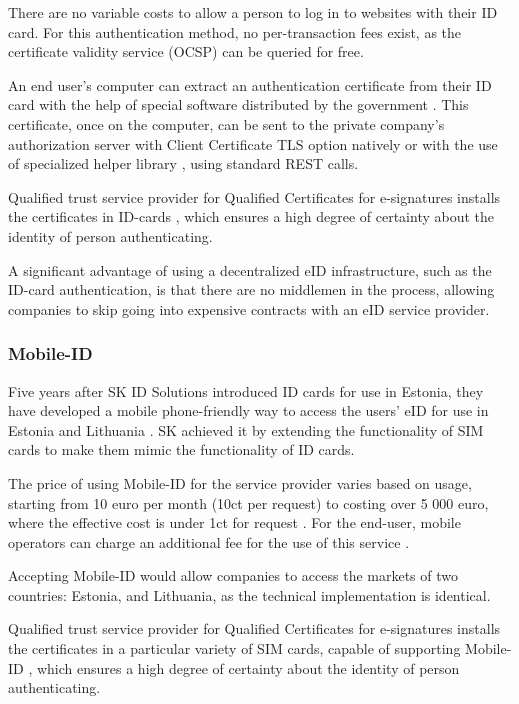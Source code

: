 There are no variable costs to allow a person to log in to websites with their ID card. For this authentication method, no per-transaction fees exist, as the certificate validity service (OCSP) \cite{rfc6960} can be queried for free.

An end user's computer can extract an authentication certificate from their ID card with the help of special software distributed by the government \cite{ria-idee}. This certificate, once on the computer, can be sent to the private company's authorization server with Client Certificate TLS option \cite{rfc8446} natively or with the use of specialized helper library \cite{ria-webeid}, using standard REST calls.

Qualified trust service provider for Qualified Certificates for e-signatures  installs the certificates in ID-cards \cite{eu-trustservices}, which ensures a high degree of certainty about the identity of person authenticating.

A significant advantage of using a decentralized eID infrastructure, such as the ID-card authentication, is that there are no middlemen in the process, allowing companies to skip going into expensive contracts with an eID service provider.

\subsubsection{Mobile-ID}

Five years after SK ID Solutions introduced ID cards for use in Estonia, they have developed a mobile phone-friendly way to access the users' eID for use in Estonia and Lithuania \cite{sk-history2007}. SK achieved it by extending the functionality of SIM cards to make them mimic the functionality of ID cards.

The price of using Mobile-ID for the service provider varies based on usage, starting from 10 euro per month (10ct per request) to costing over 5 000 euro, where the effective cost is under 1ct for request \cite{sk-mobileidpricing}. For the end-user, mobile operators can charge an additional fee for the use of this service \cite{telia-mobileid}.

Accepting Mobile-ID would allow companies to access the markets of two countries: Estonia, and Lithuania, as the technical implementation is identical.

Qualified trust service provider for Qualified Certificates for e-signatures installs the certificates in a particular variety of SIM cards, capable of supporting Mobile-ID \cite{eu-trustservices}, which ensures a high degree of certainty about the identity of person authenticating.

